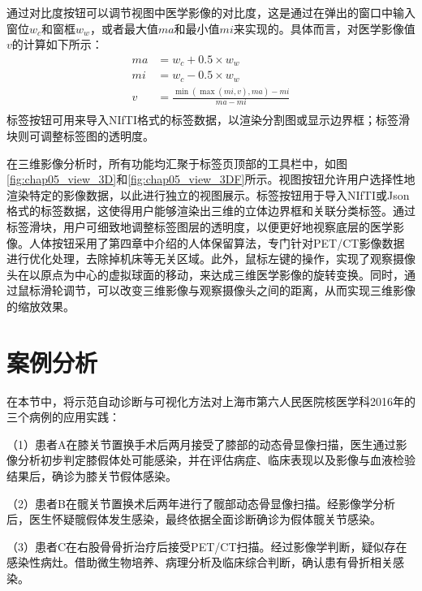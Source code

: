 通过对比度按钮可以调节视图中医学影像的对比度，这是通过在弹出的窗口中输入窗位\(w_c\)和窗框\(w_w\)，或者最大值\(ma\)和最小值\(mi\)来实现的。具体而言，对医学影像值\(v\)的计算如下所示：
\begin{equation}
  \begin{aligned}
    ma & = w_c + 0.5 \times w_w                       \\
    mi & = w_c - 0.5 \times w_w                       \\
    v  & = \frac{\min(\max(mi, v), ma) - mi}{ma - mi} \\
  \end{aligned}
  \label{eq:chap05_constrast}
\end{equation}
标签按钮可用来导入NIfTI格式的标签数据，以渲染分割图或显示边界框；标签滑块则可调整标签图的透明度。

在三维影像分析时，所有功能均汇聚于标签页顶部的工具栏中，如图\ref{fig:chap05_view_3D}和\ref{fig:chap05_view_3DF}所示。视图按钮允许用户选择性地渲染特定的影像数据，以此进行独立的视图展示。标签按钮用于导入NIfTI或Json格式的标签数据，这使得用户能够渲染出三维的立体边界框和关联分类标签。通过标签滑块，用户可细致地调整标签图层的透明度，以便更好地视察底层的医学影像。人体按钮采用了第四章中介绍的人体保留算法，专门针对PET/CT影像数据进行优化处理，去除掉机床等无关区域。此外，鼠标左键的操作，实现了观察摄像头在以原点为中心的虚拟球面的移动，来达成三维医学影像的旋转变换。同时，通过鼠标滑轮调节，可以改变三维影像与观察摄像头之间的距离，从而实现三维影像的缩放效果。

\section{案例分析}

在本节中，将示范自动诊断与可视化方法对上海市第六人民医院核医学科2016年的三个病例的应用实践：

（1）患者A在膝关节置换手术后两月接受了膝部的动态骨显像扫描，医生通过影像分析初步判定膝假体处可能感染，并在评估病症、临床表现以及影像与血液检验结果后，确诊为膝关节假体感染。

（2）患者B在髋关节置换术后两年进行了髋部动态骨显像扫描。经影像学分析后，医生怀疑髋假体发生感染，最终依据全面诊断确诊为假体髋关节感染。

（3）患者C在右股骨骨折治疗后接受PET/CT扫描。经过影像学判断，疑似存在感染性病灶。借助微生物培养、病理分析及临床综合判断，确认患有骨折相关感染。


